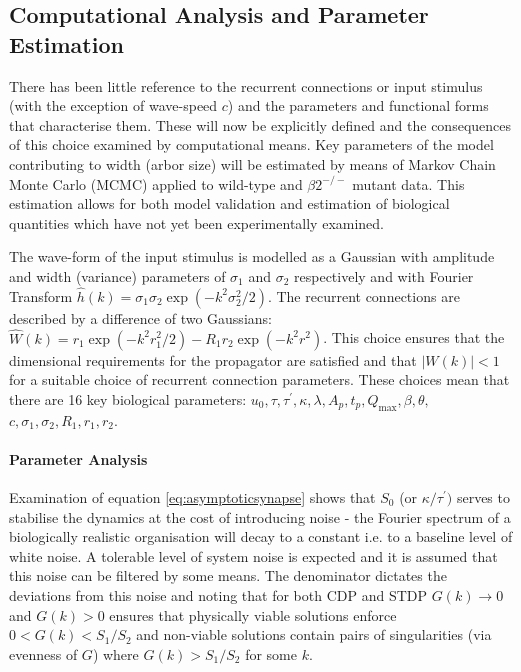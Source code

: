 \subsection{Computational Analysis and Parameter Estimation}
There has been little reference to the recurrent connections or input stimulus (with the exception of wave-speed $c$) and the parameters and functional forms that characterise them. These will now be explicitly defined and the consequences of this choice examined by computational means. Key parameters of the model contributing to width (arbor size) will be estimated by means of Markov Chain Monte Carlo (MCMC) applied to wild-type and $\beta2^{-/-}$ mutant data. This estimation allows for both model validation and estimation of biological quantities which have not yet been experimentally examined.

The wave-form of the input stimulus is modelled as a Gaussian with amplitude and width (variance) parameters of $\sigma_1$ and $\sigma_2$ respectively and with Fourier Transform $\hat{h}(k) = \sigma_1 \sigma_2\exp(-k^2\sigma_2^2/2)$. The recurrent connections are described by a difference of two Gaussians: $\hat{W}(k) =  r_1\exp(-k^2 r_1^2/2) -  R_1r_2\exp(-k^2 r^2)$. This choice ensures that the dimensional requirements for the propagator are satisfied and that $|W(k)|<1$ for a suitable choice of recurrent connection parameters. These choices mean that there are 16 key biological parameters: $u_0, \tau, \tau^\prime, \kappa, \lambda, A_p, t_p, Q_\text{max}, \beta, \theta, $\\$c, \sigma_1, \sigma_2, R_1, r_1, r_2$.

\paragraph{Parameter Analysis} \label{sec:param}
Examination of equation \ref{eq:asymptoticsynapse} shows that $S_0$ (or $\kappa/\tau^{\prime})$ serves to stabilise the dynamics at the cost of introducing noise - the Fourier spectrum of a biologically realistic organisation will decay to a constant i.e. to a baseline level of white noise. A tolerable level of system noise is expected and it is assumed that this noise can be filtered by some means. The denominator dictates the deviations from this noise and noting that for both CDP and STDP $G(k) \rightarrow 0$ and $G(k)>0$ ensures that physically viable solutions enforce $0<G(k)<S_1/S_2$ and non-viable solutions contain pairs of singularities (via evenness of $G$) where $G(k)>S_1/S_2$ for some $k$. 


